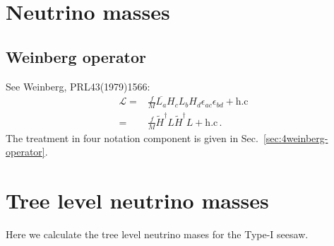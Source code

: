 
\chapter{Neutrino masses}

\section{Weinberg operator}

See Weinberg,  PRL43(1979)1566:
\begin{align*}
    \mathcal{L} 
  =&\frac{f}{M}\overline{L_a}H_cL_bH_d\epsilon_{ac}\epsilon_{bd}+\text{h.c}\nonumber\\
  =&\frac{f}{M}\widetilde{H}^\dagger {L}\widetilde{H}^\dagger {L}+\text{h.c}\,.
\end{align*}
The treatment in four notation component is given in Sec.~\ref{sec:4weinberg-operator}.
\chapter{Tree level neutrino masses}
Here we calculate the tree level neutrino mases for the Type-I seesaw.



